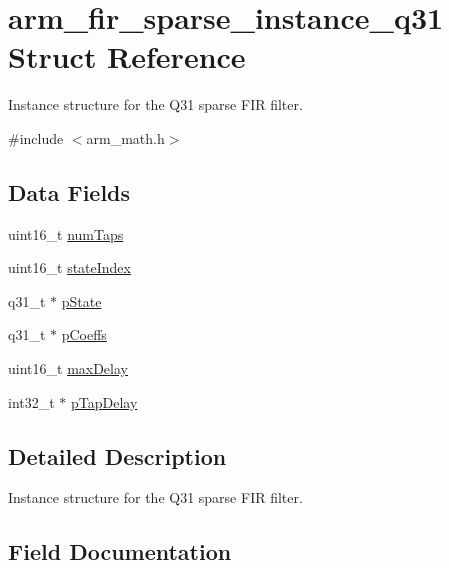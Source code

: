 \hypertarget{structarm__fir__sparse__instance__q31}{}\section{arm\+\_\+fir\+\_\+sparse\+\_\+instance\+\_\+q31 Struct Reference}
\label{structarm__fir__sparse__instance__q31}


Instance structure for the Q31 sparse F\+IR filter.  




{\ttfamily \#include $<$arm\+\_\+math.\+h$>$}

\subsection*{Data Fields}
\begin{DoxyCompactItemize}
\item 
uint16\+\_\+t \mbox{\hyperlink{structarm__fir__sparse__instance__q31_a751941891e47f522a7f5375fe8990aac}{num\+Taps}}
\item 
uint16\+\_\+t \mbox{\hyperlink{structarm__fir__sparse__instance__q31_a566a0cb53437e48b9a3bf18e5b03d8aa}{state\+Index}}
\item 
q31\+\_\+t $\ast$ \mbox{\hyperlink{structarm__fir__sparse__instance__q31_adee4ba3ee8869865af7d8fa08ca913d6}{p\+State}}
\item 
q31\+\_\+t $\ast$ \mbox{\hyperlink{structarm__fir__sparse__instance__q31_a68888e36167d81cb7836db10367a1682}{p\+Coeffs}}
\item 
uint16\+\_\+t \mbox{\hyperlink{structarm__fir__sparse__instance__q31_ab25f4ee7550e6d92acff77ada283733f}{max\+Delay}}
\item 
int32\+\_\+t $\ast$ \mbox{\hyperlink{structarm__fir__sparse__instance__q31_adec00b3793ab4f08edfeb4ea6a9eb6e6}{p\+Tap\+Delay}}
\end{DoxyCompactItemize}


\subsection{Detailed Description}
Instance structure for the Q31 sparse F\+IR filter. 

\subsection{Field Documentation}
\mbox{\label{structarm__fir__sparse__instance__q31_ab25f4ee7550e6d92acff77ada283733f}} 
